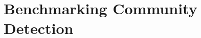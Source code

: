 \renewcommand{\thechapter}{4}
\chapter{Benchmarking Community Detection}
\label{chapter:40-Community-Detection-Case-Study}










